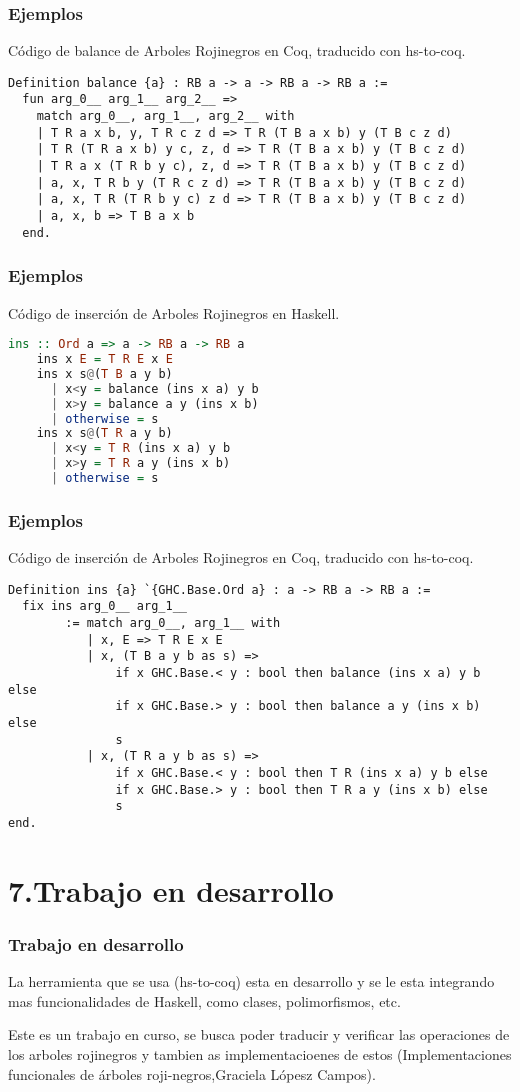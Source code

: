 \documentclass[xcolor=dvipsnames,table,handout]{beamer}
\begin{document}
\begin{frame}[fragile]
  \frametitle{Ejemplos}
  Código de balance de Arboles Rojinegros en Coq, traducido con hs-to-coq.
       \begin{lstlisting}[language=Coq]
 Definition balance {a} : RB a -> a -> RB a -> RB a :=
  fun arg_0__ arg_1__ arg_2__ =>
    match arg_0__, arg_1__, arg_2__ with
    | T R a x b, y, T R c z d => T R (T B a x b) y (T B c z d)
    | T R (T R a x b) y c, z, d => T R (T B a x b) y (T B c z d)
    | T R a x (T R b y c), z, d => T R (T B a x b) y (T B c z d)
    | a, x, T R b y (T R c z d) => T R (T B a x b) y (T B c z d)
    | a, x, T R (T R b y c) z d => T R (T B a x b) y (T B c z d)
    | a, x, b => T B a x b
  end.
       \end{lstlisting}
\end{frame}


\begin{frame}[fragile]
  \frametitle{Ejemplos}
  Código de inserción de Arboles Rojinegros en Haskell.
       \begin{lstlisting}[language=haskell]
    ins :: Ord a => a -> RB a -> RB a
    ins x E = T R E x E
    ins x s@(T B a y b)
      | x<y = balance (ins x a) y b
      | x>y = balance a y (ins x b)
      | otherwise = s
    ins x s@(T R a y b)
      | x<y = T R (ins x a) y b
      | x>y = T R a y (ins x b)
      | otherwise = s
       \end{lstlisting}
\end{frame}

\begin{frame}[fragile]
  \frametitle{Ejemplos}
  Código de inserción de Arboles Rojinegros en Coq, traducido con hs-to-coq.
       \begin{lstlisting}[language=Coq]
Definition ins {a} `{GHC.Base.Ord a} : a -> RB a -> RB a :=
  fix ins arg_0__ arg_1__
        := match arg_0__, arg_1__ with
           | x, E => T R E x E
           | x, (T B a y b as s) =>
               if x GHC.Base.< y : bool then balance (ins x a) y b else
               if x GHC.Base.> y : bool then balance a y (ins x b) else
               s
           | x, (T R a y b as s) =>
               if x GHC.Base.< y : bool then T R (ins x a) y b else
               if x GHC.Base.> y : bool then T R a y (ins x b) else
               s
end.
       \end{lstlisting}
\end{frame}

\section{7.Trabajo en desarrollo}
\begin{frame}
  \frametitle{Trabajo en desarrollo}
  La herramienta que se usa (hs-to-coq) esta en desarrollo y se le esta integrando mas funcionalidades de Haskell, como clases, polimorfismos, etc.

  Este es un trabajo en curso, se busca poder traducir y verificar las operaciones de los arboles rojinegros y tambien as implementacioenes de estos (Implementaciones funcionales de árboles roji-negros,Graciela Lópesz Campos).
\end{frame}
\end{document}
